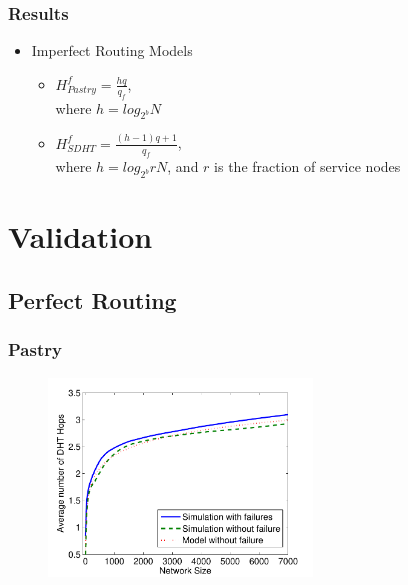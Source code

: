 \documentclass[xcolor=pdftex,dvipsnames,table]{beamer}
\begin{document}
\begin{frame}
\frametitle{Results}
   \begin{itemize}
    \item Imperfect Routing Models  \vspace{+0.2in}
      \begin{itemize}
        \item {\Large \textbf{$H^f_{Pastry} = \frac{hq}{q_f}$}}, \\ \vspace{+0.1in} where $h = log_{2^b}
        N$ \vspace{+0.3in}
        \item {\Large \textbf{$H^f_{SDHT} =  \frac{(h-1)q+1}{q_f}$}}, \\ \vspace{+0.1in} where
        $h = log_{2^b}rN$, and $r$ is the fraction of service nodes
      \end{itemize}
  \end{itemize}
\end{frame}


\section{Validation}
\subsection{Perfect Routing}
\begin{frame}
   \frametitle{Pastry}
  \begin{center}
    \begin{figure}%
        \includegraphics[width=7cm]{pdfplots/val_past1.pdf}
    \end{figure} \end{center}
\end{frame}
\end{document}
